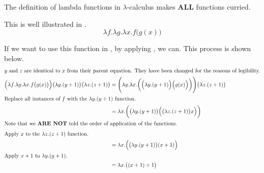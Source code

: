 \begin{remark*}
  The definition of lambda functions in $\lambda$-calculus makes \textbf{ALL} functions curried.
\end{remark*}

This is well illustrated in .
\begin{equation}\label{eq:Higher_Order_Lambda_Function}
  \lambda f. \lambda g. \lambda x. f \bigl( g(x) \bigr)
\end{equation}

If we want to use this function in , by applying , we can.
This process is shown below.
\begin{align*}
  \intertext{$y$ and $z$ are identical to $x$ from their parent equation. They have been changed for the reasons of legibility.}
  \Bigl( \lambda f. \lambda g. \lambda x. f \bigl( g(x) \bigr) \Bigr) \bigl( \lambda y. (y+1) \bigr) \bigl( \lambda z. (z+1) \bigr) &= \Biggl( \lambda g. \lambda x. \biggl( \Bigl( \lambda y. (y+1) \Bigr) \Bigr(g (x) \Bigr) \biggr) \Biggr) \bigl( \lambda z. (z+1) \bigr) \\
  \shortintertext{Replace all instances of $f$ with the $\lambda y. (y+1)$ function.}
                                                                                                                                    &= \lambda x. \biggl( \bigl( \lambda y. (y+1) \bigr) \Bigl( \bigl( \lambda z. (z+1) \bigr) x \Bigr) \biggr) \\
  \intertext{Note that we \textbf{ARE NOT} told the order of application of the functions.}
  \shortintertext{Apply $x$ to the $\lambda z. (z+1)$ function.}
                                                                                                                                    &= \lambda x. \Bigl( \bigl( \lambda y. (y+1) \bigr) (x+1) \Bigr) \\
  \shortintertext{Apply $x+1$ to $\lambda y. (y+1)$.}
                                                                                                                                    &= \lambda x. \bigl( (x+1) + 1 \bigr) \\
\end{align*}

